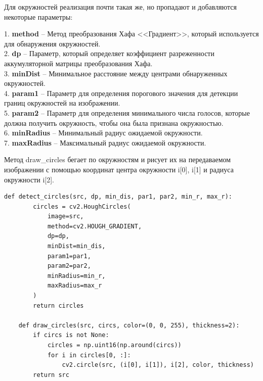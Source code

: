 \documentclass[a4paper, 16pt]{article}
\begin{document}
    \noindent Для окружностей реализация почти такая же, но пропадают и добавляются некоторые параметры:
    \begin{center}
        1. \textbf{method} -- Метод преобразования Хафа <<Градиент>>, который используется для обнаружения окружностей.\\
        2. \textbf{dp} -- Параметр, который определяет коэффициент разреженности аккумуляторной матрицы преобразования Хафа.\\
        3. \textbf{minDist} -- Минимальное расстояние между центрами обнаруженных окружностей.\\
        4. \textbf{param1} -- Параметр для определения порогового значения для детекции границ окружностей на изображении.\\
        5. \textbf{param2} -- Параметр для определения минимального числа голосов, которые должна получить окружность, чтобы она была признана окружностью.\\
        6. \textbf{minRadius} -- Минимальный радиус ожидаемой окружности.\\
        7. \textbf{maxRadius} -- Максимальный радиус ожидаемой окружности.\\
    \end{center}


    \noindent Метод draw\_{circles} бегает по окружностям и рисует их на передаваемом изображении с помощью
    координат центра окружности i[0], i[1] и радиуса окружности i[2].
    \begin{lstlisting}[label=code5, caption={Алгоритм Хафа для поиска и отрисовки окружностей.}]
    def detect_circles(src, dp, min_dis, par1, par2, min_r, max_r):
        circles = cv2.HoughCircles(
            image=src,
            method=cv2.HOUGH_GRADIENT,
            dp=dp,
            minDist=min_dis,
            param1=par1,
            param2=par2,
            minRadius=min_r,
            maxRadius=max_r
        )
        return circles
    
    def draw_circles(src, circs, color=(0, 0, 255), thickness=2):
        if circs is not None:
            circles = np.uint16(np.around(circs))
            for i in circles[0, :]:
                cv2.circle(src, (i[0], i[1]), i[2], color, thickness)
        return src
    \end{lstlisting}
\end{document}
